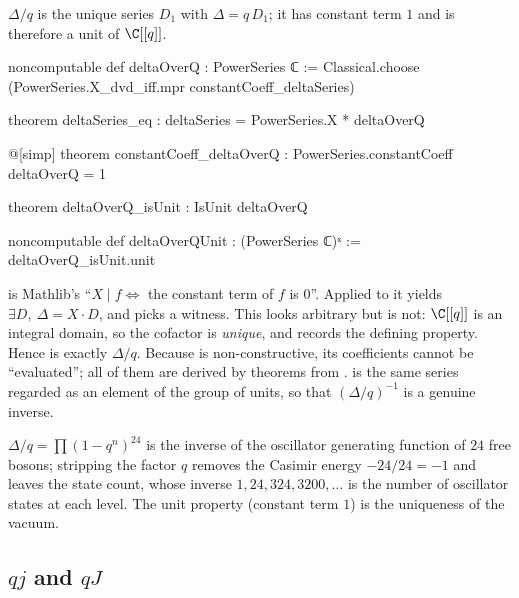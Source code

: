 \begin{definition}[$\Delta/q$]\label{ch05:def:deltaoverq}
$\Delta/q$ is the unique series $D_1$ with $\Delta = q\,D_1$; it has constant term $1$ and is therefore a
unit of $\C[[q]]$.
\end{definition}
\begin{leancode}
noncomputable def deltaOverQ : PowerSeries ℂ :=
  Classical.choose (PowerSeries.X_dvd_iff.mpr constantCoeff_deltaSeries)

theorem deltaSeries_eq : deltaSeries = PowerSeries.X * deltaOverQ

@[simp] theorem constantCoeff_deltaOverQ : PowerSeries.constantCoeff deltaOverQ = 1

theorem deltaOverQ_isUnit : IsUnit deltaOverQ

noncomputable def deltaOverQUnit : (PowerSeries ℂ)ˣ := deltaOverQ_isUnit.unit
\end{leancode}
\begin{dictionary}
 is Mathlib's ``$X\mid f\iff$ the constant term of $f$ is $0$''. Applied to
 it yields $\exists D,\ \Delta = X\cdot D$, and 
picks a witness. This looks arbitrary but is not: $\C[[q]]$ is an integral domain, so the cofactor
is \emph{unique}, and  records the defining property. Hence  is
exactly $\Delta/q$. Because  is non-constructive, its coefficients cannot be
``evaluated''; all of them are derived by theorems from . 
is the same series regarded as an element of the group of units, so that $(\Delta/q)^{-1}$ is a
genuine inverse.
\end{dictionary}

\begin{physics}
$\Delta/q=\prod(1-q^n)^{24}$ is the inverse of the oscillator generating function of $24$ free bosons; stripping the factor $q$ removes the Casimir energy $-24/24=-1$ and leaves the state count, whose inverse $1,24,324,3200,\dots$ is the number of oscillator states at each level. The unit property (constant term $1$) is the uniqueness of the vacuum.
\end{physics}

\subsection{\texorpdfstring{$qj$}{q j} and \texorpdfstring{$qJ$}{q J}}

